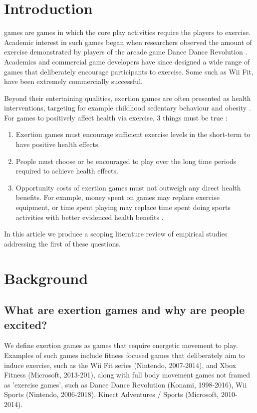 \section{Introduction}
 games are games in which the core play activities require the players to exercise. Academic interest in such games began when researchers observed the amount of exercise demonstrated by players of the arcade game Dance Dance Revolution \cite{tan2002aerobic}. Academics and commercial game developers have since designed a wide range of games that deliberately encourage participants to exercise. Some such as Wii Fit, have been extremely commercially successful.

Beyond their entertaining qualities, exertion games are often presented as health interventions, targeting for example  childhood sedentary behaviour and obesity \cite{marshall2017misrepresentation}. For games to positively affect health via exercise, 3 things must be true \cite{Dutta2015EffectsReview}:
\begin{enumerate}
    \item Exertion games must encourage sufficient exercise levels in the short-term to have positive health effects.
    \item People must choose or be encouraged to play over the long time periods required to achieve health effects.
    \item Opportunity costs of exertion games must not outweigh any direct health benefits. For example, money spent on games may replace exercise equipment, or time spent playing may replace time spent doing sports activities with better evidenced health benefits \cite{Dutta2015EffectsReview}.
\end{enumerate}
In this article we produce a scoping literature review \cite{arksey2005scoping} of empirical studies addressing the first of these questions. 

\section{Background}

\subsection{What are exertion games and why are people excited?}

We define exertion games as games that require energetic movement to play. Examples of such games include fitness focused games that deliberately aim to induce exercise, such as the Wii Fit series (Nintendo, 2007-2014), and Xbox Fitness (Microsoft, 2013-201), along with full body movement games not framed as 'exercise games', such as Dance Dance Revolution (Konami, 1998-2016), Wii Sports (Nintendo, 2006-2018), Kinect Adventures / Sports (Microsoft, 2010-2014).  

